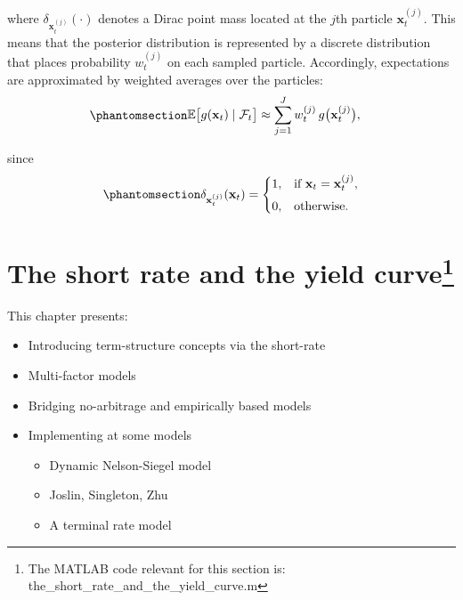\documentclass[
  letterpaper,
  DIV=11,
  numbers=noendperiod]{scrreprt}
\providecommand{\tightlist}{%
  \setlength{\itemsep}{0pt}\setlength{\parskip}{0pt}}
\begin{document}
where \(\delta_{\mathbf{x}_t^{(j)}}(\cdot)\) denotes a Dirac point mass
located at the \(j\)th particle \(\mathbf{x}_t^{(j)}\). This means that
the posterior distribution is represented by a discrete distribution
that places probability \(w_t^{(j)}\) on each sampled particle.
Accordingly, expectations are approximated by weighted averages over the
particles: \begin{equation}\protect\phantomsection\label{eq-gen-0146}{
\begin{align}
    \mathbb{E}\big[g(\mathbf{x}_t)\mid \mathcal{F}_t\big]
    &\approx
    \sum_{j=1}^J w_t^{(j)}\, g\big(\mathbf{x}_t^{(j)}\big),
\end{align}
}\end{equation}

since \begin{equation}\protect\phantomsection\label{eq-gen-0147}{
\begin{align}
    \delta_{\mathbf{x}_t^{(j)}}(\mathbf{x}_t)
    =
    \begin{cases}
        1, & \text{if } \mathbf{x}_t = \mathbf{x}_t^{(j)},\\[4pt]
        0, & \text{otherwise.}
    \end{cases}
\end{align}
}\end{equation}


\chapter[The short rate and the yield curve]{\texorpdfstring{The short
rate and the yield
curve\footnote{The MATLAB code relevant for this section is:
  the\_short\_rate\_and\_the\_yield\_curve.m}}{The short rate and the yield curve}}\label{sec:shortRateModel}

\begin{tcolorbox}[enhanced jigsaw, arc=.35mm, bottomrule=.15mm, breakable, colback=white, colframe=quarto-callout-color-frame, left=2mm, leftrule=.75mm, opacityback=0, rightrule=.15mm, toprule=.15mm]

This chapter presents:

\begin{itemize}
\tightlist
\item
  Introducing term-structure concepts via the short-rate
\item
  Multi-factor models
\item
  Bridging no-arbitrage and empirically based models
\item
  Implementing at some models

  \begin{itemize}
  \tightlist
  \item
    Dynamic Nelson-Siegel model
  \item
    Joslin, Singleton, Zhu
  \item
    A terminal rate model
  \end{itemize}
\end{itemize}

\end{tcolorbox}
\end{document}
